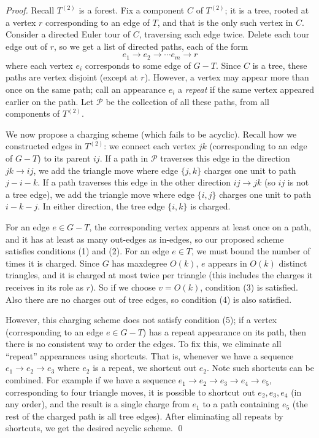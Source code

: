 \documentclass{llncs}
\begin{document}
\begin{proof}
Recall $T^{(2)}$ is a forest.  Fix a component $C$ of $T^{(2)}$; it is
a tree, rooted at a vertex $r$ corresponding to an edge of $T$, and
that is the only such vertex in $C$.  Consider a directed Euler tour
of $C$, traversing each edge twice.  Delete each tour edge out of $r$,
so we get a list of directed paths, each of the form
\[
e_1 \rightarrow e_2 \rightarrow \cdots e_m \rightarrow r
\]
where each vertex $e_i$ corresponds to some edge of $G-T$.  Since $C$
is a tree, these paths are vertex disjoint (except at $r$).  However,
a vertex may appear more than once on the same path; call an
appearance $e_i$ a \emph{repeat} if the same vertex appeared earlier
on the path.  Let $\mathcal{P}$ be the collection of all these paths,
from all components of $T^{(2)}$.

We now propose a charging scheme (which fails to be acyclic).  Recall
how we constructed edges in $T^{(2)}$: we connect each vertex $jk$
(corresponding to an edge of $G-T$) to its parent $ij$.  If a path in
$\mathcal{P}$ traverses this edge in the direction $jk \rightarrow
ij$, we add the triangle move where edge $\{j,k\}$ charges one unit
to path $j-i-k$.  If a path traverses this edge in the other
direction $ij \rightarrow jk$ (so $ij$ is not a tree edge), we
add the triangle move where edge $\{i,j\}$ charges one unit to path $i-k-j$.
In either direction, the tree edge $\{i,k\}$ is charged.

For an edge $e \in G-T$, the corresponding vertex appears at least
once on a path, and it has at least as many out-edges as in-edges, so
our proposed scheme satisfies conditions (1) and (2).  For an edge $e \in
T$, we must bound the number of times it is charged.  Since $G$ has
maxdegree $O(k)$, $e$ appears in $O(k)$ distinct triangles, and it is
charged at most twice per triangle (this includes the charges it
receives in its role as $r$).  So if we choose $v=O(k)$, condition (3) is satisfied.
Also there are no charges out of tree edges, so condition (4) is also satisfied.

However, this charging scheme does not satisfy condition (5); if a vertex
(corresponding to an edge $e \in G-T$) has a repeat appearance on its
path, then there is no consistent way to order the edges.  To fix
this, we eliminate all ``repeat'' appearances using shortcuts.
That is, whenever we have a sequence $e_1 \rightarrow e_2 
\rightarrow e_3$ where $e_2$ is a repeat, we shortcut out $e_2$.
Note such shortcuts can be combined.  For example if we have a sequence
$e_1 \rightarrow e_2 \rightarrow e_3 \rightarrow e_4 \rightarrow e_5$,
corresponding to four triangle moves, it is possible to shortcut out
$e_2,e_3,e_4$ (in any order), and the result is a single charge from
$e_1$ to a path containing $e_5$ (the rest of the charged path is all
tree edges).  After eliminating all repeats by shortcuts, we get the
desired acyclic scheme.
\qed
\end{proof}
\end{document}
